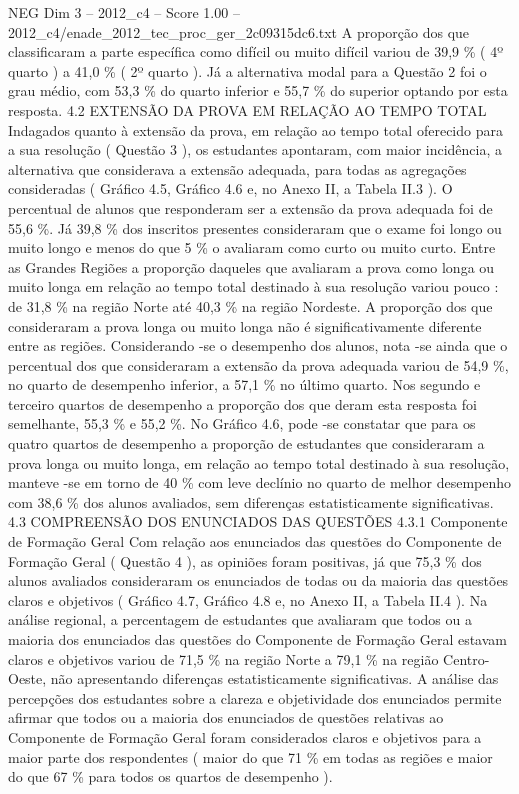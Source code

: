 \begin{textsample}{NEG Dim 3 – 2012\_c4 – Score 1.00 – 2012\_c4/enade\_2012\_tec\_proc\_ger\_2c09315dc6.txt}
A proporção dos que classificaram a parte específica como difícil ou muito difícil variou de 39,9 \% ( 4º quarto ) a 41,0 \% ( 2º quarto ).
Já a alternativa modal para a Questão 2 foi o grau médio, com 53,3 \% do quarto inferior e 55,7 \% do superior optando por esta resposta. 4.2 EXTENSÃO DA PROVA EM RELAÇÃO AO TEMPO TOTAL Indagados quanto à extensão da prova, em relação ao tempo total oferecido para a sua resolução ( Questão 3 ), os estudantes apontaram, com maior incidência, a alternativa que considerava a extensão adequada, para todas as agregações consideradas ( Gráfico 4.5, Gráfico 4.6 e, no Anexo II, a Tabela II.3 ).
O percentual de alunos que responderam ser a extensão da prova adequada foi de 55,6 \%.
Já 39,8 \% dos inscritos presentes consideraram que o exame foi longo ou muito longo e menos do que 5 \% o avaliaram como curto ou muito curto.
Entre as Grandes Regiões a proporção daqueles que avaliaram a prova como longa ou muito longa em relação ao tempo total destinado à sua resolução variou pouco : de 31,8 \% na região Norte até 40,3 \% na região Nordeste.
A proporção dos que consideraram a prova longa ou muito longa não é significativamente diferente entre as regiões.
Considerando -se o desempenho dos alunos, nota -se ainda que o percentual dos que consideraram a extensão da prova adequada variou de 54,9 \%, no quarto de desempenho inferior, a 57,1 \% no último quarto.
Nos segundo e terceiro quartos de desempenho a proporção dos que deram esta resposta foi semelhante, 55,3 \% e 55,2 \%.
No Gráfico 4.6, pode -se constatar que para os quatro quartos de desempenho a proporção de estudantes que consideraram a prova longa ou muito longa, em relação ao tempo total destinado à sua resolução, manteve -se em torno de 40 \% com leve declínio no quarto de melhor desempenho com 38,6 \% dos alunos avaliados, sem diferenças estatisticamente significativas. 4.3 COMPREENSÃO DOS ENUNCIADOS DAS QUESTÕES 4.3.1 Componente de Formação Geral Com relação aos enunciados das questões do Componente de Formação Geral ( Questão 4 ), as opiniões foram positivas, já que 75,3 \% dos alunos avaliados consideraram os enunciados de todas ou da maioria das questões claros e objetivos ( Gráfico 4.7, Gráfico 4.8 e, no Anexo II, a Tabela II.4 ).
Na análise regional, a percentagem de estudantes que avaliaram que todos ou a maioria dos enunciados das questões do Componente de Formação Geral estavam claros e objetivos variou de 71,5 \% na região Norte a 79,1 \% na região Centro-Oeste, não apresentando diferenças estatisticamente significativas.
A análise das percepções dos estudantes sobre a clareza e objetividade dos enunciados permite afirmar que todos ou a maioria dos enunciados de questões relativas ao Componente de Formação Geral foram considerados claros e objetivos para a maior parte dos respondentes ( maior do que 71 \% em todas as regiões e maior do que 67 \% para todos os quartos de desempenho ).

\end{textsample}
